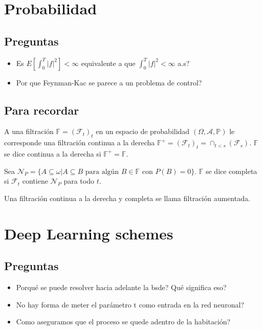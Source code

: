 \documentclass{article}
\newenvironment{recordar}[1][Recordar]
{\begin{tcolorbox}[breakable,colback=red!10!white,colframe=red!50!blue,title=Recordar: #1 ,enhanced jigsaw]
	
}{\end{tcolorbox}}
\begin{document}
    \section*{Probabilidad}
    \subsection*{Preguntas}
    \begin{itemize}
    	\item Es $E[\int_{0}^{T} |f|^2]<\infty$ equivalente a que $\int_{0}^{T}|f|^2<\infty$ a.s?
    	\item Por que Feynman-Kac se parece a un problema de control?
    \end{itemize}
    \subsection*{Para recordar}
    \begin{recordar}[Filtración aumentada]
    	A una filtración $\mathbb{F}=(\mathcal{F}_t)_t$ en un espacio de probabilidad $(\Omega,\mathcal{A},\mathbb{P})$ le corresponde una filtración continua a la derecha $\mathbb{F}^+=(\mathcal{F}_t)_t=\cap_{t<s}(\mathcal{F}_s)$. $\mathbb{F}$ se dice continua a la derecha si $\mathbb{F}^+=\mathbb{F}$.
    	
    	Sea $\mathcal{N}_P=\{A\subseteq \omega | A\subseteq B \text{ para algún } B\in \mathbb{F} \text{ con } P(B)=0\}$. $\mathbb{F}$ se dice completa si $\mathcal{F}_t$ contiene $\mathcal{N}_P$ para todo $t$.
    	
    	Una filtración continua a la derecha y completa se llama filtración aumentada.
    \end{recordar}
	\section*{Deep Learning schemes}
	\subsection*{Preguntas}
	\begin{itemize}
		\item Porqué se puede resolver hacia adelante la bsde? Qué significa eso?
		\item No hay forma de meter el parámetro t como entrada en la red neuronal?
		\item Como aseguramos que el proceso se quede adentro de la habitación?
	\end{itemize}
\end{document}
